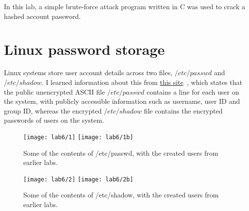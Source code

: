 In this lab, a simple brute-force attack program written in C was used to crack a hashed account password.

\section{Linux password storage}\label{sec:linux-password-storage}
Linux systems store user account details across two files, $/etc/passwd$ and $/etc/shadow$.
I learned information about this from
\href{https://www.cyberciti.biz/faq/understanding-etcpasswd-file-format/}{this site}~\autocite{accStorage},
which states that the public unencrypted ASCII file $/etc/passwd$ contains a line for each user on the system,
with publicly accessible information such as username, user ID and group ID, whereas the encrypted $/etc/shadow$
file contains the encrypted passwords of users on the system.

\begin{figure}[H]
    \centering
    \texttt{[image: lab6/1]}
    \texttt{[image: lab6/1b]}
    \caption{Some of the contents of /etc/passwd, with the created users from earlier labs.}
    \label{fig:etcpasswd}
\end{figure}

\begin{figure}[H]
    \centering
    \texttt{[image: lab6/2]}
    \texttt{[image: lab6/2b]}
    \caption{Some of the contents of /etc/shadow, with the created users from earlier labs.}
    \label{fig:etcshadow}
\end{figure}






